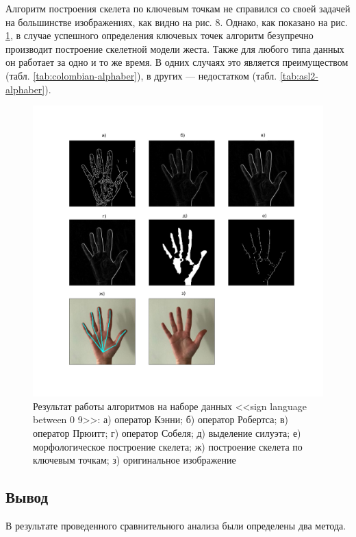 Алгоритм построения скелета по ключевым точкам не справился со своей задачей на большинстве изображениях, как видно на рис. 8. Однако, как показано на рис. \ref{an:compare2}, в случае успешного определения ключевых точек алгоритм безупречно производит построение скелетной модели жеста. Также для любого типа данных он работает за одно и то же время. В одних случаях это является преимуществом (табл. \ref{tab:colombian-alphaber}), в других — недостатком (табл. \ref{tab:asl2-alphaber}).

\begin{figure}[!h]
	\centering
	\includegraphics[width=\textwidth]{inc/img/compare2}
	\caption{Результат работы алгоритмов на наборе данных <<sign language between 0 9>>: а) оператор Кэнни; б) оператор Робертса; в) оператор Прюитт; г) оператор Собеля; д) выделение силуэта; е) морфологическое построение скелета; ж) построение скелета по ключевым точкам; з) оригинальное изображение}
	\label{an:compare2}
\end{figure}

\subsection{Вывод}

В результате проведенного сравнительного анализа были определены два метода. 

